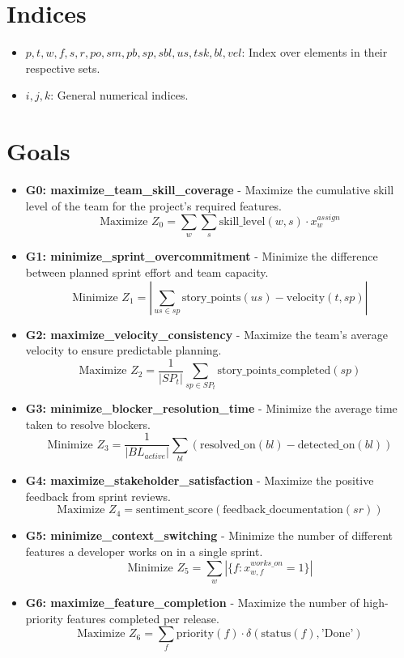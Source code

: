 \documentclass[11pt]{article}
\begin{document}
\section{Indices}
\begin{itemize}
    \item $p, t, w, f, s, r, po, sm, pb, sp, sbl, us, tsk, bl, vel$: Index over elements in their respective sets.
    \item $i, j, k$: General numerical indices.
\end{itemize}

\section{Goals}
\begin{itemize}
    \item \textbf{G0: maximize\_team\_skill\_coverage} - Maximize the cumulative skill level of the team for the project's required features.
        \[ \text{Maximize } Z_0 = \sum_{w} \sum_{s} \text{skill\_level}(w, s) \cdot x_{w}^{assign} \]
    \item \textbf{G1: minimize\_sprint\_overcommitment} - Minimize the difference between planned sprint effort and team capacity.
        \[ \text{Minimize } Z_1 = | \sum_{us \in sp} \text{story\_points}(us) - \text{velocity}(t, sp) | \]
    \item \textbf{G2: maximize\_velocity\_consistency} - Maximize the team's average velocity to ensure predictable planning.
        \[ \text{Maximize } Z_2 = \frac{1}{|SP_t|} \sum_{sp \in SP_t} \text{story\_points\_completed}(sp) \]
    \item \textbf{G3: minimize\_blocker\_resolution\_time} - Minimize the average time taken to resolve blockers.
        \[ \text{Minimize } Z_3 = \frac{1}{|BL_{active}|} \sum_{bl} (\text{resolved\_on}(bl) - \text{detected\_on}(bl)) \]
    \item \textbf{G4: maximize\_stakeholder\_satisfaction} - Maximize the positive feedback from sprint reviews.
        \[ \text{Maximize } Z_4 = \text{sentiment\_score}(\text{feedback\_documentation}(sr)) \]
    \item \textbf{G5: minimize\_context\_switching} - Minimize the number of different features a developer works on in a single sprint.
        \[ \text{Minimize } Z_5 = \sum_{w} |\{ f : x_{w, f}^{works\_on} = 1 \}| \]
    \item \textbf{G6: maximize\_feature\_completion} - Maximize the number of high-priority features completed per release.
        \[ \text{Maximize } Z_6 = \sum_{f} \text{priority}(f) \cdot \delta(\text{status}(f), \text{'Done'}) \]

\end{itemize}
\end{document}
